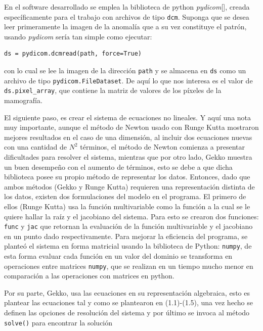 \par En el software desarrollado se emplea la biblioteca de python \textit{pydicom}[\cite{15}], creada espec\'ificamente para el trabajo con archivos de tipo \texttt{dcm}. Suponga que se desea leer primeramente la imagen de la anomal\'ia que a su vez constituye el patr\'on, usando \textit{pydicom} ser\'ia tan simple como ejecutar:\\
\begin{lstlisting}[caption=Leer una imagen .dcm, label=pydicom-read]
ds = pydicom.dcmread(path, force=True)
\end{lstlisting}
con lo cual se lee la imagen de la direcci\'on \texttt{path} y se almacena en \texttt{ds} como un archivo de tipo \texttt{pydicom.FileDataset}. De aqu\'i lo que nos interesa es el valor de \texttt{ds.pixel\_array}, que contiene la matriz de valores de los p\'ixeles de la mamograf\'ia.\\

\par El siguiente paso, es crear el sistema de ecuaciones no lineales. Y aqu\'i una nota muy importante, aunque el m\'etodo de Newton usado con Runge Kutta mostraron mejores resultados en el caso de una dimensi\'on, al incluir dos ecuaciones nuevas con una cantidad de $N^2$ t\'erminos, el m\'etodo de Newton comienza a presentar dificultades para resolver el sistema, mientras que por otro lado, Gekko muestra un buen desempe\~no con el aumento de t\'erminos, esto se debe a que dicha biblioteca posee su propio m\'etodo de representar los datos. Entonces, dado que ambos m\'etodos (Gekko y Runge Kutta) requieren una representaci\'on distinta de los datos, existen dos formulaciones del modelo en el programa. El primero de ellos (Runge Kutta) usa la funci\'on multivariable como la funci\'on a la cual se le quiere hallar la ra\'iz y el jacobiano del sistema. Para esto se crearon dos funciones: \texttt{func} y \texttt{jac} que retornan la evaluaci\'on de la funci\'on multivariable y el jacobiano en un punto dado respectivamente. Para mejorar la eficiencia del programa, se plante\'o el sistema en forma matricial usando la biblioteca de Python: \texttt{numpy}, de esta forma evaluar cada funci\'on en un valor del dominio se transforma en operaciones entre matrices \texttt{numpy}, que se realizan en un tiempo mucho menor en comparaci\'on a las operaciones con matrices en python.
\par Por su parte, Gekko, usa las ecuaciones en su representaci\'on algebraica, esto es plantear las ecuaciones tal y como se plantearon en (1.1)-(1.5), una vez hecho se definen las opciones de resoluci\'on del sistema y por \'ultimo se invoca al m\'etodo \texttt{solve()} para encontrar la soluci\'on\\

